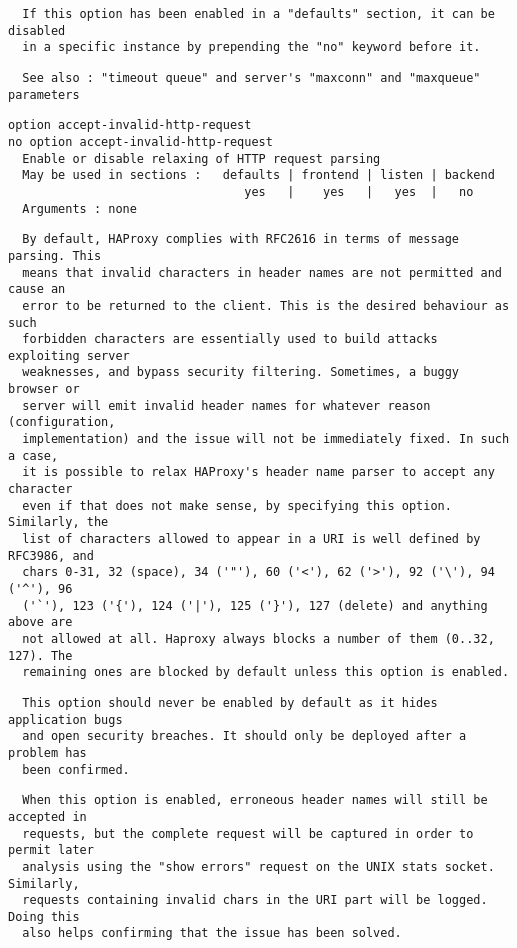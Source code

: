 \begin{verbatim}
  If this option has been enabled in a "defaults" section, it can be disabled
  in a specific instance by prepending the "no" keyword before it.
\end{verbatim}

\begin{verbatim}
  See also : "timeout queue" and server's "maxconn" and "maxqueue" parameters
\end{verbatim}

\begin{verbatim}
option accept-invalid-http-request
no option accept-invalid-http-request
  Enable or disable relaxing of HTTP request parsing
  May be used in sections :   defaults | frontend | listen | backend
                                 yes   |    yes   |   yes  |   no
  Arguments : none
\end{verbatim}

\begin{verbatim}
  By default, HAProxy complies with RFC2616 in terms of message parsing. This
  means that invalid characters in header names are not permitted and cause an
  error to be returned to the client. This is the desired behaviour as such
  forbidden characters are essentially used to build attacks exploiting server
  weaknesses, and bypass security filtering. Sometimes, a buggy browser or
  server will emit invalid header names for whatever reason (configuration,
  implementation) and the issue will not be immediately fixed. In such a case,
  it is possible to relax HAProxy's header name parser to accept any character
  even if that does not make sense, by specifying this option. Similarly, the
  list of characters allowed to appear in a URI is well defined by RFC3986, and
  chars 0-31, 32 (space), 34 ('"'), 60 ('<'), 62 ('>'), 92 ('\'), 94 ('^'), 96
  ('`'), 123 ('{'), 124 ('|'), 125 ('}'), 127 (delete) and anything above are
  not allowed at all. Haproxy always blocks a number of them (0..32, 127). The
  remaining ones are blocked by default unless this option is enabled.
\end{verbatim}

\begin{verbatim}
  This option should never be enabled by default as it hides application bugs
  and open security breaches. It should only be deployed after a problem has
  been confirmed.
\end{verbatim}

\begin{verbatim}
  When this option is enabled, erroneous header names will still be accepted in
  requests, but the complete request will be captured in order to permit later
  analysis using the "show errors" request on the UNIX stats socket. Similarly,
  requests containing invalid chars in the URI part will be logged. Doing this
  also helps confirming that the issue has been solved.
\end{verbatim}

